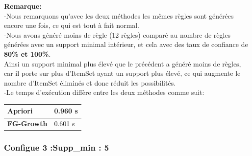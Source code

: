 \documentclass[12pt,a4paper,oneside]{book}
\begin{document}
	\textbf{Remarque:}\\
	-Nous remarquons qu'avec les deux méthodes les mêmes règles sont générées encore une fois, ce qui est tout à fait normal.\\
	-Nous avons généré moins de règle (12 règles) comparé au nombre de règles générées avec un support minimal intérieur, et cela avec des taux de confiance de \textbf{80\% et 100\%}.\\
	Ainsi un support minimal plus élevé que le précédent a généré moins de règles, car il porte sur plus d'ItemSet ayant un support plus élevé, ce qui augmente le nombre d'ItemSet éliminés et donc réduit les possibilités.\\
	-Le temps d'exécution diffère entre les deux méthodes comme suit:
	\begin{center}
		\begin{tabular}{|p{5cm}|p{5cm}|}
			\hline
			\textbf{Apriori} &
			0.960 s
			\\
			\hline
			
			\textbf{FG-Growth} 
			&
			\textbf{ }%
			0.601 s
			\\
			\hline
			
		\end{tabular} 
	\end{center}
	
	\subsubsection*{Configue 3 :Supp\_min : 5}
	
\end{document}
